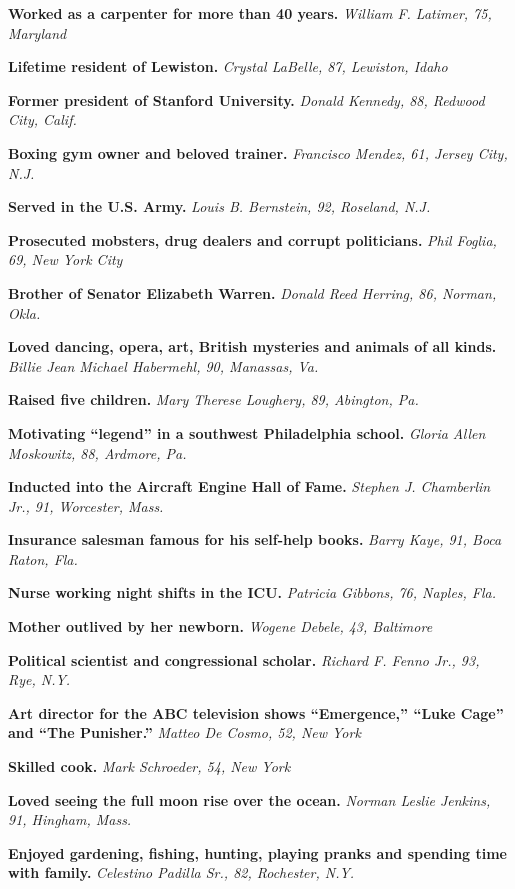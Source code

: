 \textbf{Worked as a carpenter for more than 40 years.} \emph{William F.
Latimer, 75, Maryland}

\textbf{Lifetime resident of Lewiston.} \emph{Crystal LaBelle, 87,
Lewiston, Idaho}

\textbf{Former president of Stanford University.} \emph{Donald Kennedy,
88, Redwood City, Calif.}

\textbf{Boxing gym owner and beloved trainer.} \emph{Francisco Mendez,
61, Jersey City, N.J.}

\textbf{Served in the U.S. Army.} \emph{Louis B. Bernstein, 92,
Roseland, N.J.}

\textbf{Prosecuted mobsters, drug dealers and corrupt politicians.}
\emph{Phil Foglia, 69, New York City}

\textbf{Brother of Senator Elizabeth Warren.} \emph{Donald Reed Herring,
86, Norman, Okla.}

\textbf{Loved dancing, opera, art, British mysteries and animals of all
kinds.} \emph{Billie Jean Michael Habermehl, 90, Manassas, Va.}

\textbf{Raised five children.} \emph{Mary Therese Loughery, 89,
Abington, Pa.}

\textbf{Motivating ``legend'' in a southwest Philadelphia school.}
\emph{Gloria Allen Moskowitz, 88, Ardmore, Pa.}

\textbf{Inducted into the Aircraft Engine Hall of Fame.} \emph{Stephen
J. Chamberlin Jr., 91, Worcester, Mass.}

\textbf{Insurance salesman famous for his self-help books.} \emph{Barry
Kaye, 91, Boca Raton, Fla.}

\textbf{Nurse working night shifts in the ICU.} \emph{Patricia Gibbons,
76, Naples, Fla.}

\textbf{Mother outlived by her newborn.} \emph{Wogene Debele, 43,
Baltimore}

\textbf{Political scientist and congressional scholar.} \emph{Richard F.
Fenno Jr., 93, Rye, N.Y.}

\textbf{Art director for the ABC television shows ``Emergence,'' ``Luke
Cage'' and ``The Punisher.''} \emph{Matteo De Cosmo, 52, New York}

\textbf{Skilled cook.} \emph{Mark Schroeder, 54, New York}

\textbf{Loved seeing the full moon rise over the ocean.} \emph{Norman
Leslie Jenkins, 91, Hingham, Mass.}

\textbf{Enjoyed gardening, fishing, hunting, playing pranks and spending
time with family.} \emph{Celestino Padilla Sr., 82, Rochester, N.Y.}


